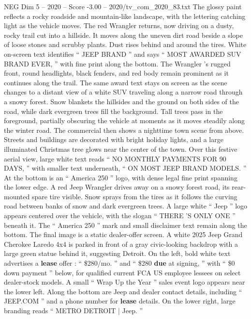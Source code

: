 \begin{textsample}{NEG Dim 5 – 2020 – Score -3.00 – 2020/tv\_com\_2020\_83.txt}
The glossy paint reflects a rocky roadside and mountain-like landscape, with the lettering catching light as the vehicle moves.
The red Wrangler returns, now driving on a dusty, rocky trail cut into a hillside.
It moves along the uneven dirt road beside a slope of loose stones and scrubby plants.
Dust rises behind and around the tires.
White on-screen text identifies “ JEEP BRAND ” and says “ MOST AWARDED SUV BRAND EVER, ” with fine print along the bottom.
The Wrangler ’s rugged front, round headlights, black fenders, and red body remain prominent as it continues along the trail.
The same award text stays on screen as the scene changes to a distant view of a white SUV traveling along a narrow road through a snowy forest.
Snow blankets the hillsides and the ground on both sides of the road, while dark evergreen trees fill the background.
Tall trees pass in the foreground, partially obscuring the vehicle at moments as it moves steadily along the winter road.
The commercial then shows a nighttime town scene from above.
Streets and buildings are decorated with bright holiday lights, and a large illuminated Christmas tree glows near the center of the town.
Over this festive aerial view, large white text reads “ NO MONTHLY PAYMENTS FOR 90 DAYS, ” with smaller text underneath, “ ON MOST JEEP BRAND MODELS. ” At the bottom is an “ America 250 ” logo, with dense legal fine print spanning the lower edge.
A red Jeep Wrangler drives away on a snowy forest road, its rear-mounted spare tire visible.
Snow sprays from the tires as it follows the curving road between banks of snow and dark evergreen trees.
A large white “ Jeep ” logo appears centered over the vehicle, with the slogan “ THERE ’S ONLY ONE ” beneath it.
The “ America 250 ” mark and small disclaimer text remain along the bottom.
The final image is a static dealer-offer screen.
A white 2025 Jeep Grand Cherokee Laredo 4x4 is parked in front of a gray civic-looking backdrop with a large green statue behind it, suggesting Detroit.
On the left, bold white text advertises a \textbf{lease} offer : “ \$280/mo. ” and “ \$280 \textbf{due} at signing, ” with “ \$0 down payment ” below, for qualified current FCA US employee lessees on select dealer-stock models.
A small “ Wrap Up the Year ” sales event logo appears near the lower left.
Along the bottom are Jeep and dealer contact details, including “ JEEP.COM ” and a phone number for \textbf{lease} details.
On the lower right, large branding reads “ METRO DETROIT | Jeep. ”

\end{textsample}
